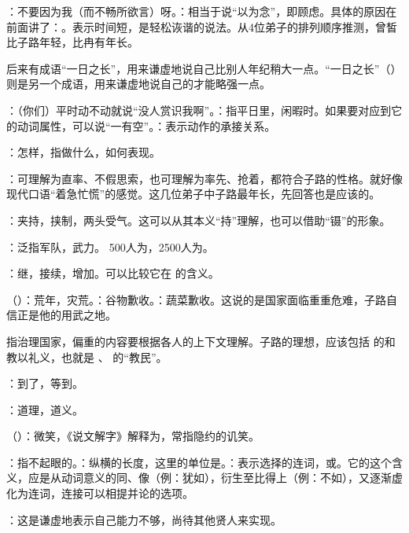 {
\item {}：不要因为我（而不畅所欲言）呀。：相当于说“以为念”，即顾虑。具体的原因在前面讲了：。表示时间短，是轻松诙谐的说法。从4位弟子的排列顺序推测，曾皙比子路年轻，比冉有年长。

后来有成语“一日之长”，用来谦虚地说自己比别人年纪稍大一点。“一日之长”（）则是另一个成语，用来谦虚地说自己的才能略强一点。

\item {}：（你们）平时动不动就说“没人赏识我啊”。：指平日里，闲暇时。如果要对应到它的动词属性，可以说“一有空”。：表示动作的承接关系。
\item {}：怎样，指做什么，如何表现。
\item {}：可理解为直率、不假思索，也可理解为率先、抢着，都符合子路的性格。就好像现代口语“着急忙慌”的感觉。这几位弟子中子路最年长，先回答也是应该的。%
\item {}：夹持，挟制，两头受气。这可以从其本义“持”理解，也可以借助“镊”的形象。
\item {}：泛指军队，武力。 500人为，2500人为。
\item {}：继，接续，增加。可以比较它在  的含义。
\item {}（）：荒年，灾荒。：谷物歉收。：蔬菜歉收。这说的是国家面临重重危难，子路自信正是他的用武之地。
\item {}指治理国家，偏重的内容要根据各人的上下文理解。子路的理想，应该包括  的和教以礼义，也就是 、 的“教民”。
\item {}：到了，等到。
\item {}：道理，道义。
\item {}（）：微笑，《说文解字》解释为，常指隐约的讥笑。
\item {}：指不起眼的。：纵横的长度，这里的单位是。：表示选择的连词，或。它的这个含义，应是从动词意义的同、像（例：犹如），衍生至比得上（例：不如），又逐渐虚化为连词，连接可以相提并论的选项。
\item {}：这是谦虚地表示自己能力不够，尚待其他贤人来实现。

}
